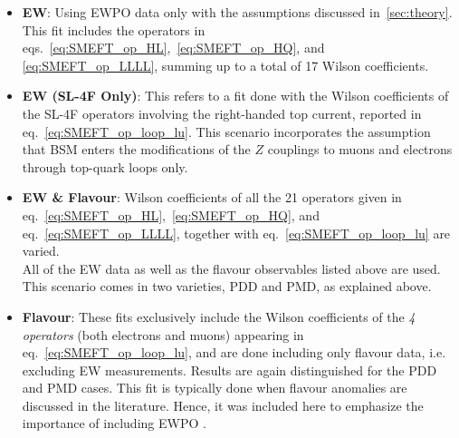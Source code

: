 \begin{itemize}
	\setlength\itemsep{0em}
	\item {\bf EW}: 
	Using EWPO data only with the assumptions discussed in~\autoref{sec:theory}. This fit includes the operators in eqs.~\eqref{eq:SMEFT_op_HL},~\eqref{eq:SMEFT_op_HQ}, and \eqref{eq:SMEFT_op_LLLL}, summing up to a total of 17 Wilson coefficients.
	\item  {\bf EW (SL-4F Only)}: This refers to a fit done with the Wilson coefficients of the { SL-4F operators} involving the right-handed top current, reported in eq.~\eqref{eq:SMEFT_op_loop_lu}. This scenario incorporates the assumption that BSM enters the modifications of the $Z$ couplings to muons and electrons through top-quark loops only.
	\item {\bf EW \& Flavour}: Wilson coefficients of all the { 21 operators} given in eq.~\eqref{eq:SMEFT_op_HL},~\eqref{eq:SMEFT_op_HQ}, and eq.~\eqref{eq:SMEFT_op_LLLL}, together with eq.~\eqref{eq:SMEFT_op_loop_lu} are varied.\\
   All of the EW data  as well as the flavour observables listed above are used. This scenario comes in two varieties, PDD and PMD, as explained above.
	\item {\bf Flavour}: These fits exclusively include the Wilson coefficients of the {\em 4 operators} (both electrons and muons) appearing in eq.~\eqref{eq:SMEFT_op_loop_lu}, and are done including only flavour data, i.e. excluding EW measurements. Results are again distinguished for the PDD and PMD cases. This fit is typically done when flavour anomalies are discussed in the literature. Hence, it was included here to emphasize the importance of including EWPO .
\end{itemize}
